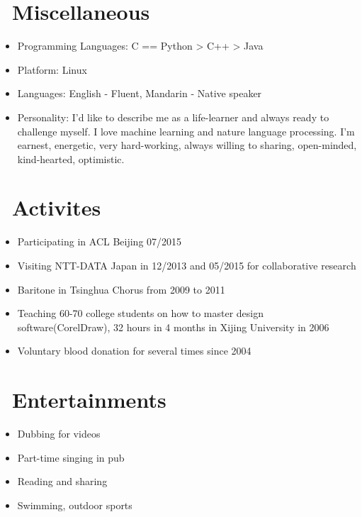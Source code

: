 \documentclass{resume}
\begin{document}
\section{\faCogs\ Miscellaneous}
\begin{itemize}[parsep=0.5ex]
  \item Programming Languages: C == Python > C++ > Java
  \item Platform: Linux
  \item Languages: English - Fluent, Mandarin - Native speaker
  \item Personality: I'd like to describe me as a life-learner and always ready to challenge myself. I love machine learning and nature language processing. I'm earnest, energetic, very hard-working, always willing to sharing, open-minded, kind-hearted, optimistic.
\end{itemize}
\section{\faMapMarker\ Activites}
\begin{itemize}[parsep=0.5ex]
\item Participating in ACL Beijing 07/2015
\item Visiting NTT-DATA Japan in 12/2013 and 05/2015 for collaborative research
\item Baritone in Tsinghua Chorus from 2009 to 2011
\item Teaching 60-70 college students on how to master design software(CorelDraw), 32 hours in 4 months in Xijing University in 2006
\item Voluntary blood donation for several times since 2004
\end{itemize}
\section{\faHeartO\ Entertainments }
\begin{itemize}[parsep=0.5ex]
\item Dubbing for videos
\item Part-time singing in pub
\item Reading and sharing
\item Swimming, outdoor sports
\end{itemize}

%
%
\end{document}
